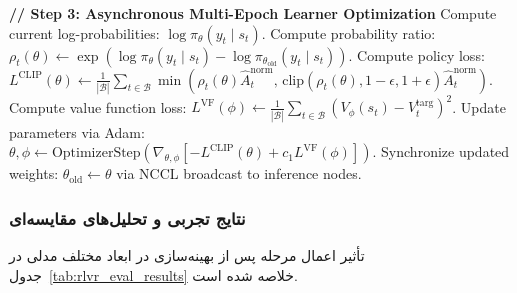 \begin{latin}
\begin{algorithm}[H]
\begin{algorithmic}[1]
    \State \textbf{// Step 3: Asynchronous Multi-Epoch Learner Optimization}
            \State Compute current log-probabilities: $\log \pi_\theta(y_t \mid s_t)$.
            \State Compute probability ratio: $\rho_t(\theta) \leftarrow \exp\left( \log \pi_\theta(y_t \mid s_t) - \log \pi_{\theta_{\text{old}}}(y_t \mid s_t) \right)$.
            \State Compute policy loss: 
            \State \quad $L^{\text{CLIP}}(\theta) \leftarrow \frac{1}{|\mathcal{B}|} \sum_{t \in \mathcal{B}} \min \left( \rho_t(\theta)\hat{A}_t^{\text{norm}}, \, \text{clip}(\rho_t(\theta), 1-\epsilon, 1+\epsilon)\hat{A}_t^{\text{norm}} \right)$.
            \State Compute value function loss: 
            \State \quad $L^{\text{VF}}(\phi) \leftarrow \frac{1}{|\mathcal{B}|} \sum_{t \in \mathcal{B}} \left( V_\phi(s_t) - V_t^{\text{targ}} \right)^2$.
            \State Update parameters via Adam: $\theta, \phi \leftarrow \text{OptimizerStep}\left(\nabla_{\theta, \phi} [-L^{\text{CLIP}}(\theta) + c_1 L^{\text{VF}}(\phi)]\right)$.
        \EndFor
    \EndFor
    \State Synchronize updated weights: $\theta_{\text{old}} \leftarrow \theta$ via NCCL broadcast to inference nodes.
\EndFor
\end{algorithmic}
\end{algorithm}
\end{latin}

\subsubsection*{نتایج تجربی و تحلیل‌های مقایسه‌ای}

تأثیر اعمال مرحله  پس از بهینه‌سازی  در ابعاد مختلف مدلی در جدول~\ref{tab:rlvr_eval_results} خلاصه شده است.

